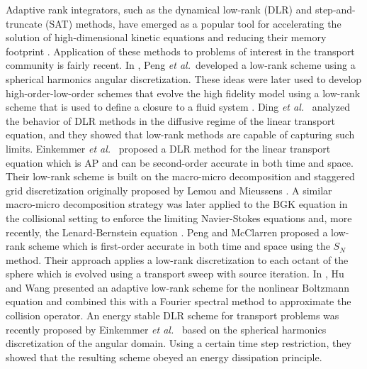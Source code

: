 \documentclass[onefignum,onetabnum]{siamart220329}
\newcommand{\etal}{\textit{et al.}~}
\begin{document}
Adaptive rank integrators, such as the dynamical low-rank (DLR) and step-and-truncate (SAT) methods, have emerged as a popular tool for accelerating the solution of high-dimensional kinetic equations and reducing their memory footprint \cite{kormann2015TTvlasov,einkemmer2021mass,GuoVlasovDLRVlasovDynamics,GuoVlasovLoMacDG2023,Einkemmer2024alfven}. Application of these methods to problems of interest in the transport community is fairly recent. In \cite{pengDLR2020spherical-harmonics}, Peng \etal developed a low-rank scheme using a spherical harmonics angular discretization. These ideas were later used to develop high-order-low-order schemes that evolve the high fidelity model using a low-rank scheme that is used to define a closure to a fluid system \cite{PengDLR2021Holo}. Ding \etal \cite{DingDLRdiffusion2021} analyzed the behavior of DLR methods in the diffusive regime of the linear transport equation, and they showed that low-rank methods are capable of capturing such limits. Einkemmer \etal \cite{EinkemmerDLR-AP} proposed a DLR method for the linear transport equation which is AP and can be second-order accurate in both time and space. Their low-rank scheme is built on the macro-micro decomposition and staggered grid discretization originally proposed by Lemou and Mieussens \cite{Lemou-Mieussens2008}. A similar macro-micro decomposition strategy was later applied to the BGK equation in the collisional setting to enforce the limiting Navier-Stokes equations \cite{EinkemmerDLR-AP-BGK} and, more recently, the Lenard-Bernstein equation \cite{coughlin2024robust}. Peng and McClarren proposed a low-rank scheme which is first-order accurate in both time and space \cite{PengDLR2023discrete-ordinates} using the $S_{N}$ method. Their approach applies a low-rank discretization to each octant of the sphere which is evolved using a transport sweep with source iteration. In \cite{hu2022adaptiveBoltzmann}, Hu and Wang presented an adaptive low-rank scheme for the nonlinear Boltzmann equation and combined this with a Fourier spectral method to approximate the collision operator. An energy stable DLR scheme for transport problems was recently proposed by Einkemmer \etal \cite{Einkemmer_AP_DLR_energy2024} based on the spherical harmonics discretization of the angular domain. Using a certain time step restriction, they showed that the resulting scheme obeyed an energy dissipation principle.
\end{document}
